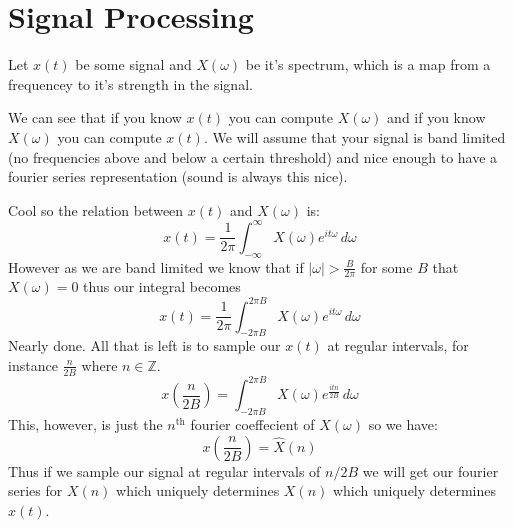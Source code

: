 \documentclass [../article.tex]{subfiles}
\begin{document}
  \section{Signal Processing}
  Let $x(t)$ be some signal and $X(\omega)$ be it's
  spectrum, which is a map from a frequencey to it's
  strength in the signal.

  We can see that if you know $x(t)$ you can compute $X(\omega)$
  and if you know $X(\omega)$ you can compute $x(t)$.
  We will assume that your signal is band limited (no
  frequencies above and below a certain threshold) and
  nice enough to have a fourier series representation
  (sound is always this nice).

  Cool so the relation between $x(t)$ and $X(\omega)$ is:
  \[x(t) = \frac{1}{2\pi}\int_{-\infty}^\infty
  X(\omega)e^{it\omega}\,d\omega\]
  However as we are band limited we know that if
  $|\omega| > \frac{B}{2\pi}$ for some $B$ that
  $X(\omega) = 0$ thus our integral becomes
  \[x(t) = \frac{1}{2\pi}\int_{-2\pi B}^{2\pi B}
  X(\omega)e^{it\omega}\,d\omega\]
  Nearly done. All that is left is to sample our $x(t)$ at
  regular intervals, for instance $\frac{n}{2B}$ where $n \in
  \mathbb{Z}$.
  \[x\left(\frac{n}{2B}\right) =
  \int_{-2\pi B}^{2\pi B}X(\omega)e^{\frac{itn}{2B}}\,d\omega\]
  This, however, is just the $n^{\text{th}}$ fourier coeffecient
  of $X(\omega)$ so we have:
  \[x\left(\frac{n}{2B}\right) = \hat{X}(n)\]
  Thus if we sample our signal at regular intervals of
  $n/2B$ we will get our fourier series for $X(n)$ which
  uniquely determines $X(n)$ which uniquely determines $x(t)$.
\end{document}
